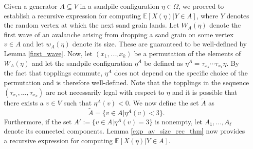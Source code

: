 \documentclass{article}
\begin{document}
Given a generator $A \subseteq V$ in a sandpile configuration $\eta \in \Omega$, we proceed to establish a recursive expression for computing $\mathbb{E}[X(\eta)|Y \in A]$, where $Y$ denotes the random vertex at which the next sand grain lands. Let $W_A(\eta)$ denote the first wave of an avalanche arising from dropping a sand grain on some vertex $v \in A$ and let $w_A(\eta)$ denote its size. These are guaranteed to be well-defined by Lemma \ref{first_wave}. Now, let $(x_1, \ldots, x_k)$ be a permutation of the elements of $W_A(\eta)$ and let the sandpile configuration $\eta^A$ be defined as $\eta^A = \tau_{x_k} \cdots \tau_{x_1} \eta$. By the fact that topplings commute, $\eta^A$ does not depend on the specific choice of the permutation and is therefore well-defined. Note that the topplings in the sequence $(\tau_{x_1}, \ldots, \tau_{x_k})$ are not necessarily legal with respect to $\eta$ and it is possible that there exists a $v \in V$ such that $\eta^A(v) < 0$. We now define the set $\tilde{A}$ as
\begin{equation*}
    \tilde{A} = \{v \in A| \eta^A(v) < 3\}.    
\end{equation*}
Furthermore, if the set $A' := \{v \in A|\eta^A(v) = 3\}$ is nonempty, let $A_1, \ldots, A_{\ell}$ denote its connected components. Lemma \ref{exp_av_size_rec_thm} now provides a recursive expression for computing $\mathbb{E}[X(\eta)|Y \in A]$.
\end{document}

